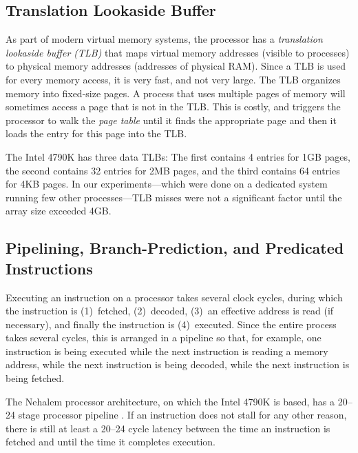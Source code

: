 \documentclass{patmorin}
\begin{document}
\subsection{Translation Lookaside Buffer}

As part of modern virtual memory systems, the processor has a
\emph{translation lookaside buffer (TLB)} that maps virtual memory
addresses (visible to processes) to physical memory addresses (addresses
of physical RAM).  Since a TLB is used for every memory access, it is very
fast, and not very large.  The TLB organizes memory into fixed-size pages.
A process that uses multiple pages of memory will sometimes access a
page that is not in the TLB. This is costly, and triggers the processor
to walk the \emph{page table} until it finds the appropriate page and
then it loads the entry for this page into the TLB.

The Intel 4790K has three data TLBs: The first contains 4 entries for
1GB pages, the second contains 32 entries for 2MB pages, and the third
contains 64 entries for 4KB pages.  In our experiments---which were done
on a dedicated system running few other processes---TLB misses were not
a significant factor until the array size exceeded 4GB.


\subsection{Pipelining, Branch-Prediction, and Predicated Instructions}

Executing an instruction on a processor takes several clock cycles, during
which the instruction is (1)~fetched, (2)~decoded, (3)~an effective
address is read (if necessary), and finally the instruction is
(4)~executed.  Since the entire process takes several cycles, this
is arranged in a pipeline so that, for example, one instruction is being
executed while the next instruction is reading a memory address, while
the next instruction is being decoded, while the next instruction is
being fetched.

The Nehalem processor architecture, on which the Intel 4790K is based, has
a 20--24 stage processor pipeline \cite{bit-tech:intel}. If an instruction
does not stall for any other reason, there is still at least a 20--24
cycle latency between the time an instruction is fetched and until the
time it completes execution.
\end{document}
